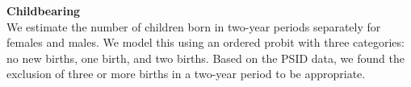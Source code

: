 \noindent \textbf{Childbearing}\\
\noindent We estimate the number of children born in two-year periods separately for females and males. We model this using an ordered probit with
three categories: no new births, one birth, and two births. Based on the PSID data, we found the exclusion of three or more
births in a two-year period to be appropriate. \\
%
%
%

